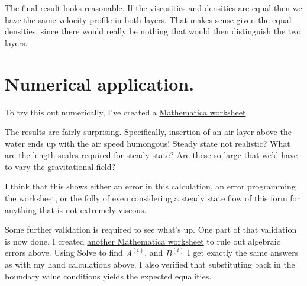 The final result looks reasonable.  If the viscosities and densities are equal then we have the same velocity profile in both layers.  That makes sense given the equal densities, since there would really be nothing that would then distinguish the two layers.

\section{Numerical application.}

To try this out numerically, I've created a \href{https://raw.github.com/peeterjoot/physicsplay/master/notes/phy454/twoLayerInclinedFlowDifferentDensities.cdf}{Mathematica worksheet}.

The results are fairly surprising.  Specifically, insertion of an air layer above the water ends up with the air speed humongous!  Steady state not realistic?  What are the length scales required for steady state?  Are these so large that we'd have to vary the gravitational field?

I think that this shows either an error in this calculation, an error programming the worksheet, or the folly of even considering a steady state flow of this form for anything that is not extremely viscous.

Some further validation is required to see what's up.  One part of that validation is now done.  I created \href{https://raw.github.com/peeterjoot/physicsplay/master/notes/phy454/twoLayerInclinedFlowDifferentDensitiesTheCalculation.cdf}{another Mathematica worksheet} to rule out algebraic errors above.  Using Solve to find $A^{(i)}$, and $B^{(i)}$ I get exactly the same answers as with my hand calculations above.  I also verified that substituting back in the boundary value conditions yields the expected equalities.

\EndArticle
